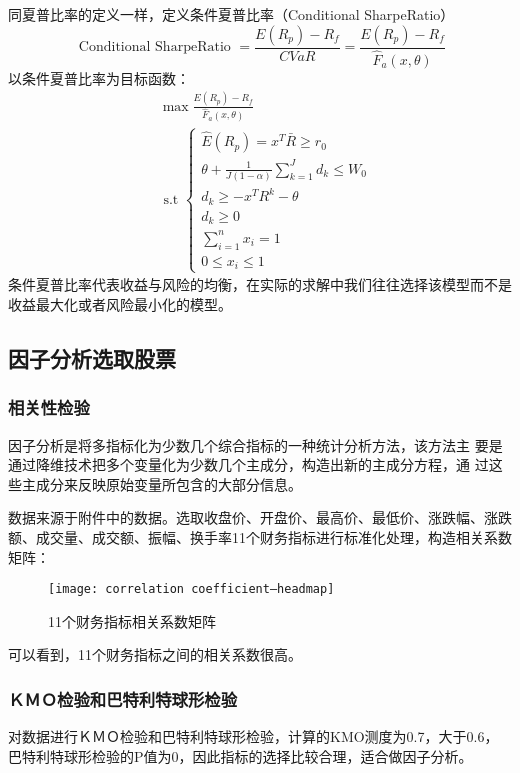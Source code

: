 \documentclass[withoutpreface,bwprint]{cumcmthesis} %
\begin{document}
同夏普比率的定义一样，定义条件夏普比率（Conditional SharpeRatio）
\begin{equation}
\text { Conditional SharpeRatio }=\frac{E\left(R_{p}\right)-R_{f}}{CVaR}=\frac{E\left(R_{p}\right)-R_{f}}{\hat{F}_{a}(x, \theta)}
\end{equation}
以条件夏普比率为目标函数：
\begin{equation}
\begin{aligned}
&\max \frac{E\left(R_{p}\right)-R_{f}}{\hat{F}_{a}(x, \theta)} \\
&\text { s.t }\left\{\begin{array}{l}
\hat{E}\left(R_{p}\right)=x^{T} \bar{R} \geq r_{0} \\
\theta+\frac{1}{J(1-\alpha)} \sum_{k=1}^{J} d_{k} \leq W_{0} \\
d_{k} \geq-x^{T} R^{k}-\theta \\
d_{k} \geq 0 \\
\sum_{i=1}^{n} x_{i}=1 \\
0 \leq x_{i} \leq 1
\end{array}\right.
\end{aligned}
\end{equation}
条件夏普比率代表收益与风险的均衡，在实际的求解中我们往往选择该模型而不是收益最大化或者风险最小化的模型。
	\subsection{因子分析选取股票}
	\subsubsection{相关性检验}
	因子分析是将多指标化为少数几个综合指标的一种统计分析方法，该方法主
	要是通过降维技术把多个变量化为少数几个主成分，构造出新的主成分方程，通
	过这些主成分来反映原始变量所包含的大部分信息。
	
	数据来源于附件中的数据。选取收盘价、开盘价、最高价、最低价、涨跌幅、涨跌额、成交量、成交额、振幅、换手率11个财务指标进行标准化处理，构造相关系数矩阵：
	
	 \begin{figure}[H]
		\centering
		\texttt{[image: correlation coefficient--headmap]}
		\caption{11个财务指标相关系数矩阵}
		\label{11个财务指标相关系数矩阵}
	\end{figure}
	可以看到，11个财务指标之间的相关系数很高。
	
	\subsubsection{ＫＭＯ检验和巴特利特球形检验}
	对数据进行ＫＭＯ检验和巴特利特球形检验，计算的KMO测度为0.7，大于0.6，巴特利特球形检验的P值为0，因此指标的选择比较合理，适合做因子分析。
\end{document}
